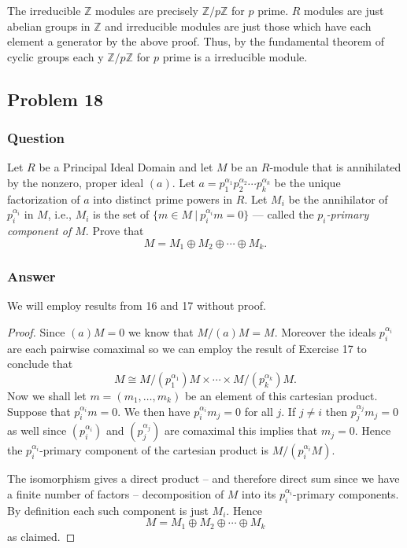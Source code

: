 \documentclass[12pt]{article}
\begin{document}
The irreducible $\mathbb{Z}$ modules are precisely $\mathbb{Z}/p \mathbb{Z}$ for $p$ prime. $R$ modules are just abelian groups in $\mathbb{Z}$ and irreducible modules are just those which have each element a generator by the above proof. Thus, by the fundamental theorem of cyclic groups each y $\mathbb{Z}/p \mathbb{Z}$ for $p$ prime is a irreducible module.

\subsection{Problem 18}
\subsubsection{Question}
Let $R$ be a Principal Ideal Domain and let $M$ be an $R$-module that is annihilated by the nonzero, proper ideal $(a)$. Let $a=p_1^{\alpha_1} p_2^{\alpha_2} \cdots p_k^{\alpha_k}$ be the unique factorization of $a$ into distinct prime powers in $R$. Let $M_i$ be the annihilator of $p_i^{\alpha_i}$ in $M$, i.e., $M_i$ is the set of $\{m\in M \ |\ p_i^{\alpha_i} m = 0 \}$ --- called the \emph{$p_i$-primary component of $M$}. Prove that 
\[M=M_1 \oplus M_2 \oplus \cdots \oplus M_k.\]
\subsubsection{Answer}
We will employ results from 16 and 17 without proof.

\begin{proof}
Since $(a)M = 0$ we know that $M/(a)M = M$. Moreover the ideals $p_i^{\alpha_i}$ are each pairwise comaximal so we can employ the result of Exercise 17 to conclude that
\[ M \cong M/(p_1^{\alpha_1})M \times \cdots \times M/(p_k^{\alpha_k})M. \]
Now we shall let $m = (m_1,\dots, m_k)$ be an element of this cartesian product. Suppose that $p_i^{\alpha_i} m = 0$. We then have $p_i^{\alpha_i} m_j = 0$ for all $j$. If $j \neq i$ then $p_j^{\alpha_j}m_j=0$ as well since $(p_i^{\alpha_i})$ and $(p_j^{\alpha_j})$ are comaximal this implies that $m_j=0$. Hence the $p_i^{\alpha_i}$-primary component of the cartesian product is $M/(p_i^{\alpha_i} M)$.

The isomorphism gives a direct product -- and therefore direct sum since we have a finite number of factors -- decomposition of $M$ into its $p_i^{\alpha_i}$-primary components. By definition each such component is just $M_i$. Hence 
\[M=M_1 \oplus M_2 \oplus \cdots \oplus M_k\]
as claimed.
\end{proof}
\end{document}
